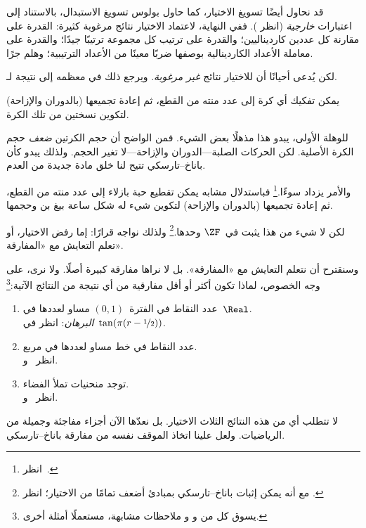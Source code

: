 \documentclass[../../../include/open-logic-section]{subfiles}
\begin{document}

قد نحاول أيضًا تسويغ الاختيار، كما حاول بولوس تسويغ الاستبدال،
بالاستناد إلى اعتبارات \emph{خارجية} (انظر
). ففي النهاية، لاعتماد الاختيار
نتائج مرغوبة كثيرة: القدرة على مقارنة كل عددين كارديناليين؛ والقدرة
على ترتيب كل مجموعة ترتيبًا جيدًا؛ والقدرة على معاملة الأعداد
الكاردينالية بوصفها ضربًا معينًا من الأعداد الترتيبية؛ وهلم جرًا.

لكن يُدعى أحيانًا أن للاختيار نتائج \emph{غير مرغوبة}. ويرجع ذلك في
معظمه إلى نتيجة لـ\cite{BanachTarski1924}.

\begin{thm}
يمكن تفكيك أي كرة إلى عدد منته من القطع، ثم إعادة تجميعها (بالدوران
والإزاحة) لتكوين نسختين من تلك الكرة.
\end{thm}
\noindent
للوهلة الأولى، يبدو هذا مذهلًا بعض الشيء. فمن الواضح أن حجم الكرتين
\emph{ضعف} حجم الكرة الأصلية. لكن الحركات الصلبة---الدوران
والإزاحة---لا تغير الحجم. ولذلك يبدو كأن باناخ--تارسكي تتيح لنا خلق
مادة جديدة من العدم.

والأمر يزداد سوءًا.\footnote{انظر~\citet[Theorem 3.12]{Wagon2016}.}
فباستدلال مشابه يمكن تقطيع حبة بازلاء إلى عدد منته من القطع، ثم إعادة
تجميعها (بالدوران والإزاحة) لتكوين شيء له شكل ساعة بيغ بن وحجمها.

لكن لا شيء من هذا يثبت في~$\ZF$ وحدها.\footnote{مع أنه يمكن إثبات
باناخ--تارسكي بمبادئ أضعف تمامًا من الاختيار؛ انظر
\citet[303]{Wagon2016}.} ولذلك نواجه قرارًا: إما رفض الاختيار، أو تعلم
التعايش مع «المفارقة».

وسنقترح أن نتعلم التعايش مع «المفارقة». بل لا نراها مفارقة كبيرة
أصلًا. ولا نرى، على وجه الخصوص، لماذا تكون أكثر أو أقل مفارقية من أي
نتيجة من النتائج الآتية:\footnote{يسوق كل من
\citet[276--7]{Potter2004} و\citet[16]{Weston2003} و
\citet[31, 308--9]{Wagon2016} ملاحظات مشابهة، مستعملًا أمثلة أخرى.}
\begin{enumerate}
	\item عدد النقاط في الفترة~$(0,1)$ مساو لعددها في~$\Real$.
	\\\emph{البرهان}: انظر في~$\tan(\pi(r-\nicefrac{1}{2}))$.
	\item عدد النقاط في خط مساو لعددها في مربع.
	\\انظر~ و.
	\item توجد منحنيات تملأ الفضاء.
	\\انظر~ و.
\end{enumerate}
لا تتطلب أي من هذه النتائج الثلاث الاختيار. بل نعدّها الآن أجزاء
مفاجئة وجميلة من الرياضيات. ولعل علينا اتخاذ الموقف نفسه من مفارقة
باناخ--تارسكي.
\end{document}

